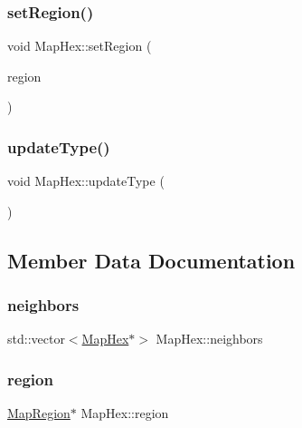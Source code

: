 \subsubsection{\texorpdfstring{set\+Region()}{setRegion()}}
{\footnotesize\ttfamily void Map\+Hex\+::set\+Region (\begin{DoxyParamCaption}\item[{\hyperlink{class_map_region}{Map\+Region} $\ast$}]{region }\end{DoxyParamCaption})\hspace{0.3cm}{\ttfamily [inline]}}

\mbox{\label{class_map_hex_a61e3572ebecb6f3c2c13c127142fd607}} 
\subsubsection{\texorpdfstring{update\+Type()}{updateType()}}
{\footnotesize\ttfamily void Map\+Hex\+::update\+Type (\begin{DoxyParamCaption}{ }\end{DoxyParamCaption})}



\subsection{Member Data Documentation}
\mbox{\label{class_map_hex_aa33e24590b6c9e6367874d6bc503cc32}} 
\subsubsection{\texorpdfstring{neighbors}{neighbors}}
{\footnotesize\ttfamily std\+::vector$<$\hyperlink{class_map_hex}{Map\+Hex}$\ast$$>$ Map\+Hex\+::neighbors\hspace{0.3cm}{\ttfamily [private]}}

\mbox{\label{class_map_hex_a717a676e9a80b8e476dc4b75c45c7645}} 
\subsubsection{\texorpdfstring{region}{region}}
{\footnotesize\ttfamily \hyperlink{class_map_region}{Map\+Region}$\ast$ Map\+Hex\+::region\hspace{0.3cm}{\ttfamily [private]}}

